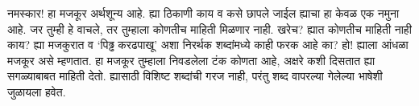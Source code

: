 नमस्कार! हा मजकूर अर्थशून्य आहे. ह्या ठिकाणी काय व कसे छापले जाईल ह्याचा हा केवळ एक नमुना आहे. जर तुम्ही हे वाचले, तर तुम्हाला कोणतीच माहिती मिळणार नाही. खरेच? ह्यात कोणतीच माहिती नाही काय? ह्या मजकुरात व `पिढ्ढ करढपाखू' अशा निरर्थक शब्दांमध्ये काही फरक आहे का? हो! ह्याला आंधळा मजकूर असे म्हणतात. हा मजकूर तुम्हाला निवडलेला टंक कोणता आहे, अक्षरे कशी दिसतात ह्या सगळ्याबाबत माहिती देतो. ह्यासाठी विशिष्ट शब्दांची गरज नाही, परंतु शब्द वापरल्या गेलेल्या भाषेशी जुळायला हवेत. \par